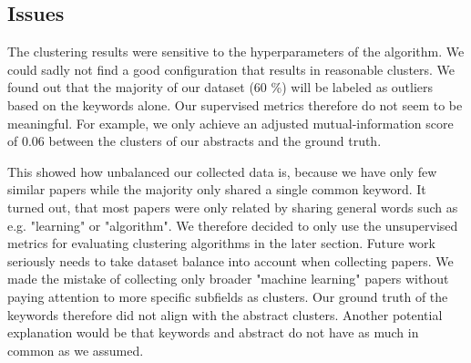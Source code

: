 \newpage
\subsection{Issues}
The clustering results were sensitive to the hyperparameters of the algorithm. We could sadly not find a good configuration that results in reasonable clusters. We found out that the majority of our dataset (60 \%) will be labeled as outliers based on the keywords alone. Our supervised metrics therefore do not seem to be meaningful. For example, we only achieve an adjusted mutual-information score of $ 0.06 $ between the clusters of our abstracts and the ground truth. 

This showed how unbalanced our collected data is, because we have only few similar papers while the majority only shared a single common keyword. It turned out, that most papers were only related by sharing general words such as e.g. "learning" or "algorithm". We therefore decided to only use the unsupervised metrics for evaluating clustering algorithms in the later section. Future work seriously needs to take dataset balance into account when collecting papers. We made the mistake of collecting only broader "machine learning" papers without paying attention to more specific subfields as clusters. Our ground truth of the keywords therefore did not align with the abstract clusters. Another potential explanation would be that keywords and abstract do not have as much in common as we assumed.
